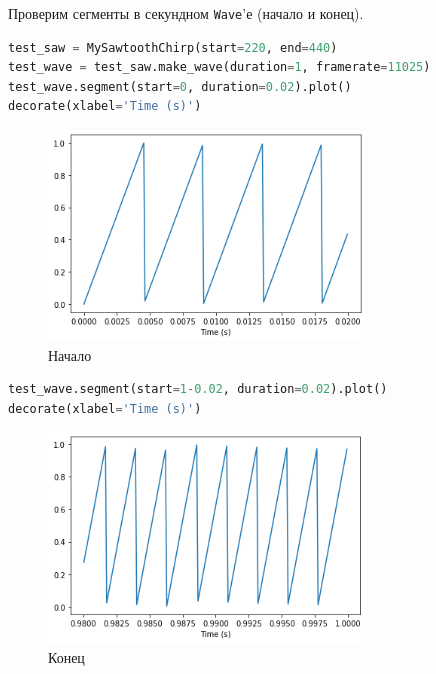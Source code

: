 \documentclass[a4paper,12pt]{report}
\begin{document}
    Проверим сегменты в секундном \texttt{Wave}'е (начало и конец).

\begin{lstlisting}[language=Python,caption=Начало]
test_saw = MySawtoothChirp(start=220, end=440)
test_wave = test_saw.make_wave(duration=1, framerate=11025)
test_wave.segment(start=0, duration=0.02).plot() 
decorate(xlabel='Time (s)')
\end{lstlisting}

    \begin{figure}[H]
        \centering
        \includegraphics[width=0.75\textwidth]{ex2_start.png}
        \caption{Начало}
        \label{fig:ex2_start}
    \end{figure}

\begin{lstlisting}[language=Python,caption=Конец]
test_wave.segment(start=1-0.02, duration=0.02).plot()
decorate(xlabel='Time (s)')
\end{lstlisting}

    \begin{figure}[H]
        \centering
        \includegraphics[width=0.75\textwidth]{ex2_end.png}
        \caption{Конец}
        \label{fig:ex2_end}
    \end{figure}
    
\end{document}

